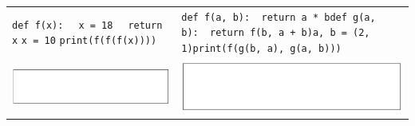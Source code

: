 \begin{center}
\begin{tabular}{p{8cm} p{8cm}}
        \texttt{def f(x):} \newline \texttt{\-\ \-\ x = 18} \newline \texttt{\-\ \-\ return x} \newline \texttt{x = 10} \newline \texttt{print(f(f(f(x))))} & \texttt{def f(a, b):}\newline \texttt{\-\ \-\ return a * b}\newline \texttt{def g(a, b):}\newline \texttt{\-\ \-\ return f(b, a + b)}\newline \texttt{a, b = (2, 1)}\newline \texttt{print(f(g(b, a), g(a, b)))} \\
        \includegraphics[scale=0.8]{Imagenes/rectangulo} & \includegraphics[scale=0.8]{Imagenes/rectangulo}
    \end{tabular}
\end{center}

